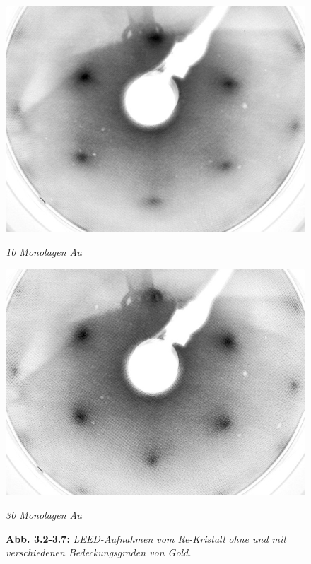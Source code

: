 \begin{figure}[htbp]
	\begin{minipage}[b]{0.5\textwidth} 
		\includegraphics[width=\textwidth]{LEED-Bilder/bearbeitet/10ML_E207}
		\caption{\textit{10 Monolagen Au}}
		\label{10ML} 
	\end{minipage}
	\hfill
	\begin{minipage}[b]{0.5\textwidth}
		\includegraphics[width=\textwidth]{LEED-Bilder/bearbeitet/30ML_E208}
		\caption{\textit{30 Monolagen Au}}
		\label{30ML} 
	\end{minipage}
	\caption*{\textbf{Abb. 3.2-3.7:} \textit{LEED-Aufnahmen vom Re-Kristall ohne und mit
	verschiedenen Bedeckungsgraden von Gold.}}
\end{figure}

